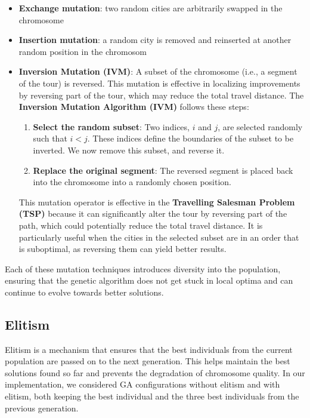 \documentclass[11pt]{article}
\begin{document}
\begin{itemize}
    \item \textbf{Exchange mutation}: two random cities are arbitrarily swapped in the chromosome
    \item \textbf{Insertion mutation}: a random city is removed and reinserted at another random position in the chromosom
    \item \textbf{Inversion Mutation (IVM)}: A subset of the chromosome (i.e., a segment of the tour) is reversed. This mutation is effective in localizing improvements by reversing part of the tour, which may reduce the total travel distance. The \textbf{Inversion Mutation Algorithm (IVM)} follows these steps:
    
    \begin{enumerate}
        \item \textbf{Select the random subset}: Two indices, $i$ and $j$, are selected randomly such that $i < j$. These indices define the boundaries of the subset to be inverted. We now remove this subset, and reverse it. 
        
        \item \textbf{Replace the original segment}: The reversed segment is placed back into the chromosome into a randomly chosen position. 
    \end{enumerate}

    \noindent This mutation operator is effective in the \textbf{Travelling Salesman Problem (TSP)} because it can significantly alter the tour by reversing part of the path, which could potentially reduce the total travel distance. It is particularly useful when the cities in the selected subset are in an order that is suboptimal, as reversing them can yield better results.
\end{itemize}


Each of these mutation techniques introduces diversity into the population, ensuring that the genetic algorithm does not get stuck in local optima and can continue to evolve towards better solutions.


\subsection{Elitism}
Elitism is a mechanism that ensures that the best individuals from the current population are passed on to the next generation. This helps maintain the best solutions found so far and prevents the degradation of chromosome quality. In our implementation, we considered GA configurations without elitism and with elitism, both keeping the best individual and the three best individuals from the previous generation.
\end{document}
